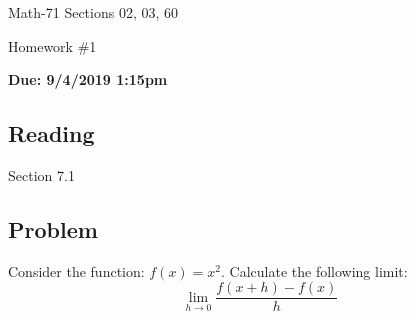 \documentclass[letterpaper,12pt,fleqn]{article}
\begin{document}
\begin{center}
  \large
  Math-71 Sections 02, 03, 60

  \Large
  Homework \#1

  \large
  \textbf{Due: 9/4/2019 1:15pm}
\end{center}

\subsection*{Reading}

Section 7.1

\subsection*{Problem}

Consider the function: \(f(x)=x^2\).  Calculate the following limit:
\[\lim_{h\to0}\frac{f(x+h)-f(x)}{h}\]
\end{document}

